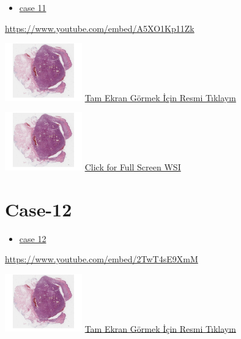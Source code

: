 \documentclass[
  letterpaper,
  paper=6in:9in,
  pagesize=pdftex,
  headinclude=on,
  footinclude=on,
  12pt]{scrbook}
\providecommand{\tightlist}{%
  \setlength{\itemsep}{0pt}\setlength{\parskip}{0pt}}\usepackage{longtable,booktabs,array}
\begin{document}
\begin{itemize}
\tightlist
\item
  \href{https://www.youtube.com/watch?v=A5XO1Kp11Zk\&ab_channel=KemalKosemehmetoglu}{case
  11}
\end{itemize}

\url{https://www.youtube.com/embed/A5XO1Kp11Zk}

\href{https://images.patolojiatlasi.com/hacettepe-com-case-1/HE.html}{\includegraphics[width=0.25\textwidth,height=\textheight]{./screenshots/hacettepe-com-case-1_screenshot.png}}
\href{https://images.patolojiatlasi.com/hacettepe-com-case-11/HE.html}{Tam
Ekran Görmek İçin Resmi Tıklayın}

\href{https://images.patolojiatlasi.com/hacettepe-com-case-1/HE.html}{\includegraphics[width=0.25\textwidth,height=\textheight]{./screenshots/hacettepe-com-case-1_screenshot.png}}
\href{https://images.patolojiatlasi.com/hacettepe-com-case-11/HE.html}{Click
for Full Screen WSI}

\hypertarget{sec-hacettepe-case-of-the-month-case-12}{%
\section{Case-12}\label{sec-hacettepe-case-of-the-month-case-12}}

\begin{itemize}
\tightlist
\item
  \href{https://www.youtube.com/watch?v=2TwT4sE9XmM\&ab_channel=KemalKosemehmetoglu}{case
  12}
\end{itemize}

\url{https://www.youtube.com/embed/2TwT4sE9XmM}

\href{https://images.patolojiatlasi.com/hacettepe-com-case-1/HE.html}{\includegraphics[width=0.25\textwidth,height=\textheight]{./screenshots/hacettepe-com-case-1_screenshot.png}}
\href{https://images.patolojiatlasi.com/hacettepe-com-case-12/HE.html}{Tam
Ekran Görmek İçin Resmi Tıklayın}
\end{document}
